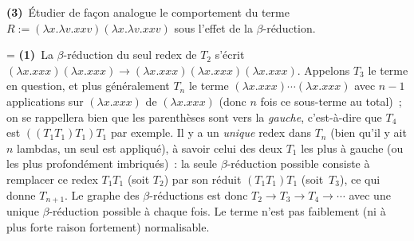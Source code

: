 \documentclass[12pt,a4paper]{article}
\theoremstyle{definition}
\newif\ifcorrige
\newenvironment{corrige}%
{\ifcorrige\relax\else\setbox0=\vbox\bgroup\fi%
\smallbreak\footnotesize\noindent{\underbar{\textit{Corrigé.}}\quad}}
{{\hbox{}\nobreak\hfill\checkmark}%
\ifcorrige\relax\else\egroup\fi\par}
\begin{document}
\textbf{(3)} Étudier de façon analogue le comportement du terme $R
:= (\lambda x.\lambda v.xxv) (\lambda x.\lambda v.xxv)$ sous l'effet
de la $\beta$-réduction.

\begin{corrige}
\textbf{(1)} La $\beta$-réduction du seul redex de $T_2$ s'écrit
$(\lambda x.xxx)(\lambda x.xxx) \rightarrow (\lambda x.xxx)(\lambda
x.xxx)(\lambda x.xxx)$.  Appelons $T_3$ le terme en question, et plus
généralement $T_n$ le terme $(\lambda x.xxx)\cdots (\lambda x.xxx)$
avec $n-1$ applications sur $(\lambda x.xxx)$ de $(\lambda x.xxx)$
(donc $n$ fois ce sous-terme au total) ; on se rappellera bien que les
parenthèses sont vers la \emph{gauche}, c'est-à-dire que $T_4$ est
$((T_1 T_1)T_1)T_1$ par exemple.  Il y a un \emph{unique} redex dans
$T_n$ (bien qu'il y ait $n$ lambdas, un seul est appliqué), à savoir
celui des deux $T_1$ les plus à gauche (ou les plus profondément
imbriqués) : la seule $\beta$-réduction possible consiste à remplacer
ce redex $T_1 T_1$ (soit $T_2$) par son réduit $(T_1 T_1) T_1$
(soit $T_3$), ce qui donne $T_{n+1}$.  Le graphe des
$\beta$-réductions est donc $T_2 \rightarrow T_3 \rightarrow T_4
\rightarrow \cdots$ avec une unique $\beta$-réduction possible à
chaque fois.  Le terme n'est pas faiblement (ni à plus forte raison
fortement) normalisable.


\end{corrige}
\end{document}
